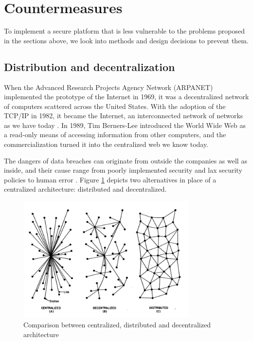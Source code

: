 \section{Countermeasures}
To implement a secure platform that is less vulnerable to the problems proposed in the sections above, we look into methods and design decisions to prevent them.
\subsection{Distribution and decentralization}
When the Advanced Research Projects Agency Network (ARPANET) implemented the prototype of the Internet in 1969, it was a decentralized network of computers scattered across the United States. With the adoption of the TCP/IP in 1982, it became the Internet, an interconnected network of networks as we have today \cite{DBLP:books/daglib/0006297}.
In 1989, Tim Berners-Lee introduced the World Wide Web as a read-only means of accessing information from other computers, and the commercialization turned it into the centralized web we know today. 

The dangers of data breaches can originate from outside the companies as well as inside, and their cause range from poorly implemented security and lax security policies to human error \cite{riskbasedsecurity}.
Figure \ref{fig:comparison} depicts two alternatives in place of a centralized architecture: distributed and decentralized.

\begin{figure}[htpb]
  \centering
  \includegraphics[width=0.8\textwidth]{figures/comparison.jpg}
  \caption{Comparison between centralized, distributed and decentralized architecture \cite{distributed}} 
  \label{fig:comparison}
\end{figure}

